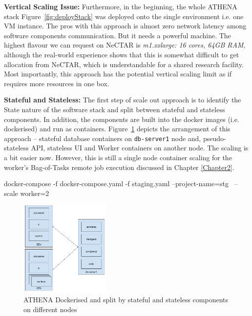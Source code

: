 \noindent \textbf{Vertical Scaling Issue:} \quad Furthermore, in the beginning, the whole ATHENA stack Figure~\ref{fig:deployStack} was deployed onto the single environment i.e. one VM instance. The pros with this approach is almost zero network latency among software components communication. But it needs a powerful machine. The highest flavour we can request on NeCTAR is \textit{m1.xxlarge: 16 cores, 64GB RAM}, although the real-world experience shows that this is somewhat difficult to get allocation from NeCTAR, which is understandable for a shared research facility. Most importantly, this approach has the potential vertical scaling limit as if requires more resources in one box.

\noindent \textbf{Stateful and Stateless:} \quad The first step of scale out approach is to identify the State nature of the software stack and split between stateful and stateless components. In addition, the components are built into the docker images (i.e. dockerised) and run as containers. Figure~\ref{fig:deployDockerised} depicts the arrangement of this approach -- stateful database containers on \verb|db-server1| node and, pseudo-stateless API, stateless UI and Worker containers on another node. The scaling is a bit easier now. However, this is still a single node container scaling for the worker's Bag-of-Tasks remote job execution discussed in Chapter \ref{Chapter2}.

\begin{small}
\begin{lcverbatim}
docker-compose -f docker-compose.yaml -f staging.yaml  --project-name=stg \
   --scale worker=2
\end{lcverbatim}
\end{small}

\begin{figure}[H]
\centering
\includegraphics[width=0.4\textwidth]{Figures/ATHENA_dockerize}
\decoRule
\caption[ATHENA Dockerised]{ATHENA Dockerised and split by stateful and stateless components on different nodes}
\label{fig:deployDockerised}
\end{figure}

